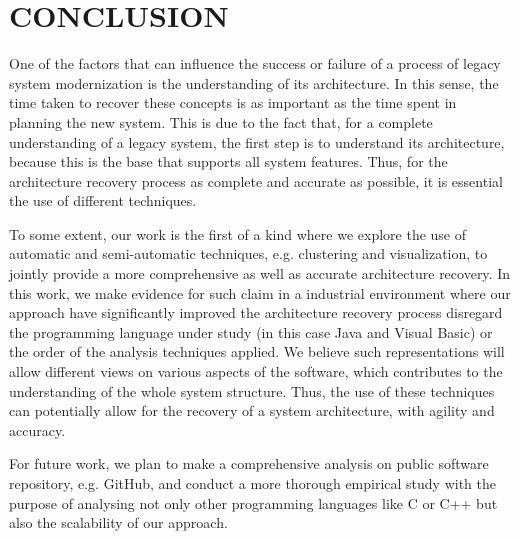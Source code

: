 \section{CONCLUSION}\label{sec:conclusion}

One of the factors that can influence the success or failure of a process of legacy system modernization is the understanding of its architecture. In this sense, the time taken to recover these concepts is as important as the time spent in planning the new system. This is due to the fact that, for a complete understanding of a legacy system, the first step is to understand its architecture, because this is the base that supports all system features. Thus, for the architecture recovery process as complete and accurate as possible, it is essential the use of different techniques.



To some extent, our work is the first of a kind where we explore the use of automatic and semi-automatic techniques, e.g. clustering and visualization, to jointly provide a more comprehensive as well as accurate architecture recovery. In this work, we make evidence for such claim in a industrial environment where our approach have significantly improved the architecture recovery process disregard the programming language under study (in this case Java and Visual Basic) or the order of the analysis techniques applied. We believe such representations will allow different views on various aspects of the software, which contributes to the understanding of the whole system structure. Thus, the use of these techniques can potentially allow for the recovery of a system architecture, with agility and accuracy. 

For future work, we plan to make a comprehensive analysis on public software repository, e.g. GitHub, and conduct a more thorough empirical study with the purpose of analysing not only other programming languages like C or C++ but also the scalability of our approach.